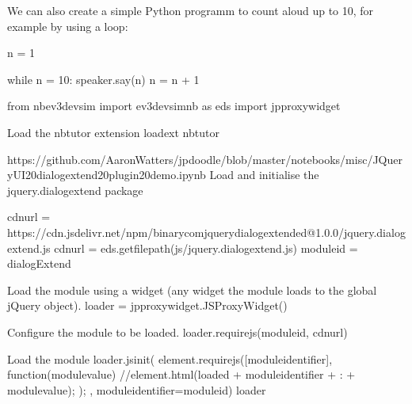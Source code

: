 \documentclass[letterpaper,10pt,english]{sphinxmanual}
\begin{document}
{We can also create a simple Python programm to count aloud up to 10, for example by using a  loop:

{
\begin{sphinxVerbatim}[commandchars=\\\{\}]
\llap{\color{nbsphinxin}[ ]:\,\hspace{\fboxrule}\hspace{\fboxsep}}n = 1

while n \PYGZlt{}= 10:
    speaker.say(n)
    n = n + 1
\end{sphinxVerbatim}
}

{
\begin{sphinxVerbatim}[commandchars=\\\{\}]
\llap{\color{nbsphinxin}[ ]:\,\hspace{\fboxrule}\hspace{\fboxsep}}from nbev3devsim import ev3devsim\PYGZus{}nb as eds
import jp\PYGZus{}proxy\PYGZus{}widget

\PYGZsh{}Load the nbtutor extension
\PYGZpc{}load\PYGZus{}ext nbtutor

\PYGZsh{}https://github.com/AaronWatters/jp\PYGZus{}doodle/blob/master/notebooks/misc/JQueryUI\PYGZpc{}20dialogextend\PYGZpc{}20plugin\PYGZpc{}20demo.ipynb
\PYGZsh{}Load and initialise the jquery.dialogextend package

cdn\PYGZus{}url = \PYGZdq{}https://cdn.jsdelivr.net/npm/binary\PYGZhy{}com\PYGZhy{}jquery\PYGZhy{}dialogextended@1.0.0/jquery.dialogextend.js\PYGZdq{}
cdn\PYGZus{}url = eds.get\PYGZus{}file\PYGZus{}path(\PYGZsq{}js/jquery.dialogextend.js\PYGZsq{})
module\PYGZus{}id = \PYGZdq{}dialogExtend\PYGZdq{}

\PYGZsh{} Load the module using a widget (any widget \PYGZhy{}\PYGZhy{} the module loads to the global jQuery object).
loader = jp\PYGZus{}proxy\PYGZus{}widget.JSProxyWidget()

\PYGZsh{} Configure the module to be loaded.
loader.require\PYGZus{}js(module\PYGZus{}id, cdn\PYGZus{}url)

\PYGZsh{} Load the module
loader.js\PYGZus{}init(\PYGZdq{}\PYGZdq{}\PYGZdq{}
    element.requirejs([module\PYGZus{}identifier], function(module\PYGZus{}value) \PYGZob{}
        //element.html(\PYGZdq{}loaded \PYGZdq{} + module\PYGZus{}identifier + \PYGZdq{} : \PYGZdq{} + module\PYGZus{}value);
    \PYGZcb{});
\PYGZdq{}\PYGZdq{}\PYGZdq{}, module\PYGZus{}identifier=module\PYGZus{}id)
loader
\end{sphinxVerbatim}
}

}
\end{document}
